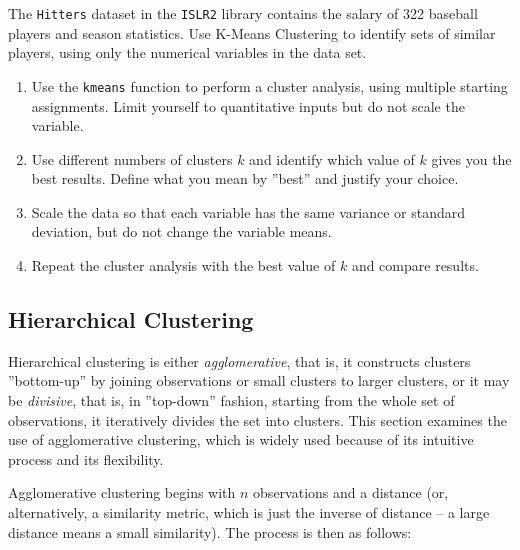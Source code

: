 \begin{exercisebox}

The \texttt{Hitters} dataset in the \texttt{ISLR2} library contains the salary of 322 baseball players and season statistics. Use K-Means Clustering to identify sets of similar players, using only the numerical variables in the data set.

\begin{enumerate}
   \item Use the \texttt{kmeans} function to perform a cluster analysis, using multiple starting assignments. Limit yourself to quantitative inputs but do not scale the variable.
   \item Use different numbers of clusters $k$ and identify which value of $k$ gives you the best results. Define what you mean by ''best'' and justify your choice.
   \item Scale the data so that each variable has the same variance or standard deviation, but do not change the variable means. 
   \item Repeat the cluster analysis with the best value of $k$ and compare results.
\end{enumerate}
\end{exercisebox}

\subsection{Hierarchical Clustering}

Hierarchical clustering is either \emph{agglomerative}, that is, it constructs clusters ''bottom-up'' by joining observations or small clusters to larger clusters, or it may be \emph{divisive}, that is, in ''top-down'' fashion, starting from the whole set of observations, it iteratively divides the set into clusters. This section examines the use of agglomerative clustering, which is widely used because of its intuitive process and its flexibility.

Agglomerative clustering begins with $n$ observations and a distance (or, alternatively, a similarity metric, which is just the inverse of distance -- a large distance means a small similarity). The process is then as follows:

